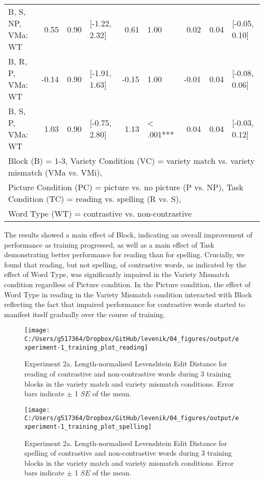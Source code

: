 \documentclass[doc,floatsintext]{apa6}
\begin{document}
\begin{table}[!h]
{\begin{tabular}{lrrlrlrrl}
B, S, NP, VMa: WT & 0.55 & 0.90 & [-1.22, 2.32] & 0.61 & 1.00 & 0.02 & 0.04 & [-0.05, 0.10]\\
B, R, P, VMa: WT & -0.14 & 0.90 & [-1.91, 1.63] & -0.15 & 1.00 & -0.01 & 0.04 & [-0.08, 0.06]\\
B, S, P, VMa: WT & 1.03 & 0.90 & [-0.75, 2.80] & 1.13 & < .001*** & 0.04 & 0.04 & [-0.03, 0.12]\\
\bottomrule
\multicolumn{9}{l}{Block (B) = 1-3, Variety Condition (VC) = variety match vs. variety mismatch (VMa vs. VMi),}\\
\multicolumn{9}{l}{Picture Condition (PC) = picture vs. no picture (P vs. NP), Task Condition (TC) = reading vs. spelling (R vs. S),}\\
\multicolumn{9}{l}{Word Type (WT) = contrastive vs. non-contrastive}\\
\end{tabular}}
\end{table}

The results showed a main effect of Block, indicating an overall
improvement of performance as training progressed, as well as a main
effect of Task demonstrating better performance for reading than for
spelling. Crucially, we found that reading, but not spelling, of
contrastive words, as indicated by the effect of Word Type, was
significantly impaired in the Variety Mismatch condition regardless of
Picture condition. In the Picture condition, the effect of Word Type in
reading in the Variety Mismatch condition interacted with Block
reflecting the fact that impaired performance for contrastive words
started to manifest itself gradually over the course of training.

\begin{figure}[htb]

{\centering \texttt{[image: C:/Users/g517364/Dropbox/GitHub/levenik/04\_figures/output/experiment-1\_training\_plot\_reading]} 

}

\caption{Experiment 2a. Length-normalised Levenshtein Edit Distance for reading of contrastive and non-contrastive words during 3 training blocks in the variety match and variety mismatch conditions. Error bars indicate $\pm$ 1 $SE$ of the mean.}\label{fig:ex1-train-reading-plots}
\end{figure}

\begin{figure}[htb]

{\centering \texttt{[image: C:/Users/g517364/Dropbox/GitHub/levenik/04\_figures/output/experiment-1\_training\_plot\_spelling]} 

}

\caption{Experiment 2a. Length-normalised Levenshtein Edit Distance for spelling of contrastive and non-contrastive words during 3 training blocks in the variety match and variety mismatch conditions. Error bars indicate $\pm$ 1 $SE$ of the mean.}\label{fig:ex1-train-spelling-plots}
\end{figure}
\end{document}
